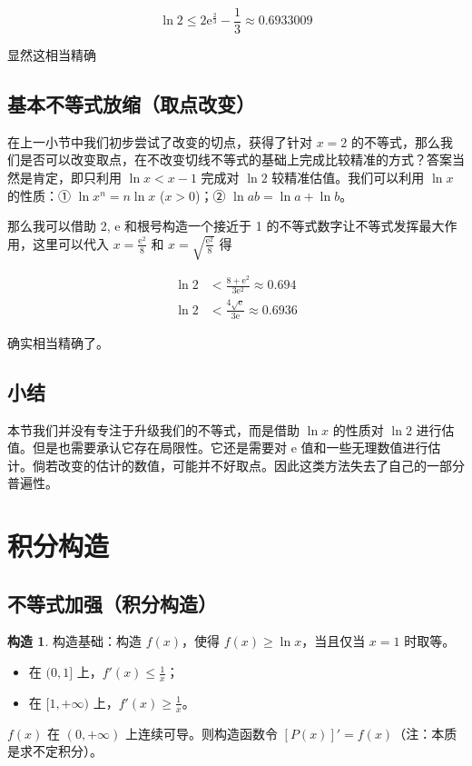 \documentclass[12pt]{article}
\theoremstyle{definition}
\theoremstyle{plain}
\theoremstyle{definition}
\newtheorem{construction}{构造}[section]
\newcommand{\ee}{\mathrm{e}}
\begin{document}
\[\ln 2 \leq 2\ee^{\frac{2}{3}} - \frac{1}{3} \approx 0.6933009\]

显然这相当精确

\subsection{基本不等式放缩（取点改变）}

在上一小节中我们初步尝试了改变的切点，获得了针对 \(x=2\)
的不等式，那么我们是否可以改变取点，在不改变切线不等式的基础上完成比较精准的方式？答案当然是肯定，即只利用
\(\ln x < x - 1\) 完成对 \(\ln 2\) 较精准估值。我们可以利用 \(\ln x\)
的性质：① \(\ln x^{n} = n \ln x\) (\(x > 0\))；② \(\ln ab = \ln a + \ln b\)。

那么我可以借助 2, \(\ee\) 和根号构造一个接近于 1
的不等式数字让不等式发挥最大作用，这里可以代入 \(x = \frac{\ee^{2}}{8}\) 和
\(x = \sqrt{\frac{\ee^{2}}{8}}\) 得

\begin{align*}
\ln 2 &< \frac{8 + \ee^{2}}{3\ee^{2}} \approx 0.694 \\
\ln 2 &< \frac{4\sqrt{\ee}}{3\ee} \approx 0.6936
\end{align*}

确实相当精确了。

\subsection{小结}

本节我们并没有专注于升级我们的不等式，而是借助 \(\ln x\) 的性质对 \(\ln 2\)
进行估值。但是也需要承认它存在局限性。它还是需要对 \(\ee\)
值和一些无理数值进行估计。倘若改变的估计的数值，可能并不好取点。因此这类方法失去了自己的一部分普遍性。

\section{积分构造}

\subsection{不等式加强（积分构造）}

\begin{construction}
构造基础：构造 \(f(x)\)，使得 \(f(x) \geq \ln x\)，当且仅当 \(x=1\) 时取等。
\begin{itemize}
    \item 在 \((0,1]\) 上，\(f'(x) \leq \frac{1}{x}\)；
    \item 在 \([1, +\infty)\) 上，\(f'(x) \geq \frac{1}{x}\)。
\end{itemize}
\(f(x)\) 在 \((0, +\infty)\) 上连续可导。则构造函数令 \([P(x)]' = f(x)\)（注：本质是求不定积分）。
\end{construction}
\end{document}
